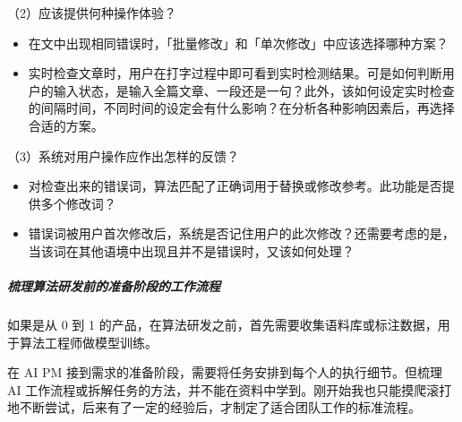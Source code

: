 \documentclass[letterpaper,10pt,english]{sphinxmanual}
\begin{document}
（2）应该提供何种操作体验？
\begin{itemize}
\item {} 
在文中出现相同错误时，「批量修改」和「单次修改」中应该选择哪种方案？

\item {} 
实时检查文章时，用户在打字过程中即可看到实时检测结果。可是如何判断用户的输入状态，是输入全篇文章、一段还是一句？此外，该如何设定实时检查的间隔时间，不同时间的设定会有什么影响？在分析各种影响因素后，再选择合适的方案。

\end{itemize}

（3）系统对用户操作应作出怎样的反馈？
\begin{itemize}
\item {} 
对检查出来的错误词，算法匹配了正确词用于替换或修改参考。此功能是否提供多个修改词？

\item {} 
错误词被用户首次修改后，系统是否记住用户的此次修改？还需要考虑的是，当该词在其他语境中出现且并不是错误时，又该如何处理？

\end{itemize}


\subparagraph{梳理算法研发前的准备阶段的工作流程}
\label{\detokenize{chapter_experience/recessive_work:id4}}
如果是从 0 到 1
的产品，在算法研发之前，首先需要收集语料库或标注数据，用于算法工程师做模型训练。

在 AI PM 接到需求的准备阶段，需要将任务安排到每个人的执行细节。但梳理 AI
工作流程或拆解任务的方法，并不能在资料中学到。刚开始我也只能摸爬滚打地不断尝试，后来有了一定的经验后，才制定了适合团队工作的标准流程。
\end{document}

